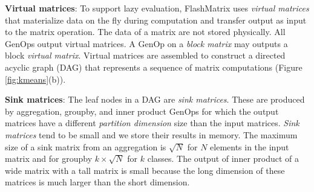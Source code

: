 \vspace{3pt}
\noindent \textbf{Virtual matrices}:
To support lazy evaluation, FlashMatrix uses \textit{virtual matrices} that
materialize data on the fly during computation and transfer output as input to
the matrix operation. The data of a matrix are not stored physically.
All GenOps output virtual matrices. A GenOp on a \textit{block matrix} may outputs
a block \textit{virtual matrix}. Virtual matrices are assembled to construct
a directed acyclic graph (DAG) that represents a sequence of matrix computations
(Figure \ref{fig:kmeans}(b)). 

\vspace{3pt}
\noindent \textbf{Sink matrices}:  The leaf nodes in a DAG are \textit{sink matrices}.
These are produced by aggregation, groupby, and inner product GenOps for which 
the output matrices have a different \textit{partition dimension} size than
the input matrices. \textit{Sink matrices} tend to be small
and we store their results in memory. 
The maximum size of a sink matrix from an aggregation
is $\sqrt{N}$ for $N$ elements in the input matrix and for
groupby $k \times \sqrt{N}$ for $k$ classes.
The output of inner product of a wide matrix with a tall matrix is small
because
the long dimension of these matrices is much larger than the short dimension.

